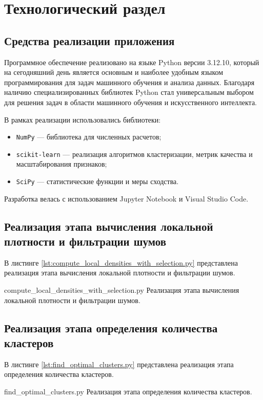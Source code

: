 \chapter{Технологический раздел}

\section{Средства реализации приложения}
Программное обеспечение реализовано на языке Python версии 3.12.10, который на сегодняшний день является основным и наиболее удобным языком программирования для задач машинного обучения и анализа данных. Благодаря наличию специализированных библиотек Python стал универсальным выбором для решения задач в области машинного обучения и искусственного интеллекта.

В рамках реализации использовались библиотеки:
\begin{itemize}
	\item \texttt{NumPy} --- библиотека для численных расчетов;
	\item \texttt{scikit-learn} --- реализация алгоритмов кластеризации, метрик качества и масштабирования признаков;
	\item \texttt{SciPy} --- статистические функции и меры сходства.
\end{itemize}

Разработка велась с использованием Jupyter Notebook и Visual Studio Code.

\section{Реализация этапа вычисления локальной плотности и фильтрации шумов}
В листинге \ref{lst:compute_local_densities_with_selection.py} представлена реализация этапа вычисления локальной плотности и фильтрации шумов.

{compute_local_densities_with_selection.py}
{Реализация этапа вычисления локальной плотности и фильтрации шумов.}

\section{Реализация этапа определения количества кластеров}
В листинге \ref{lst:find_optimal_clusters.py} представлена реализация этапа определения количества кластеров.

{find_optimal_clusters.py}
{Реализация этапа определения количества кластеров.}

